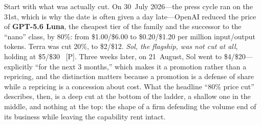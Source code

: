 Start with what was actually cut. On 30~July 2026---the press cycle ran on the 31st, which is why the date is often given a day late---OpenAI reduced the price of \textbf{GPT-5.6 Luna}, the cheapest tier of the family and the successor to the ``nano'' class, by 80\%: from \$1.00/\$6.00 to \$0.20/\$1.20 per million input/output tokens. Terra was cut 20\%, to \$2/\$12. \emph{Sol, the flagship, was not cut at all}, holding at \$5/\$30~\cite{openai-luna} [P]. Three weeks later, on 21~August, Sol went to \$4/\$20---explicitly ``for the next 3 months,'' which makes it a promotion rather than a repricing, and the distinction matters because a promotion is a defense of share while a repricing is a concession about cost. What the headline ``80\% price cut'' describes, then, is a deep cut at the bottom of the ladder, a shallow one in the middle, and nothing at the top: the shape of a firm defending the volume end of its business while leaving the capability rent intact.

